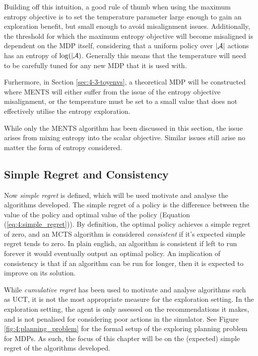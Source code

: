         Building off this intuition, a good rule of thumb when using the maximum entropy objective is to set the temperature parameter large enough to gain an exploration benefit, but small enough to avoid misalignment issues. Additionally, the threshold for which the maximum entropy objective will become misaligned is dependent on the MDP itself, considering that a uniform policy over $|\mathcal{A}|$ actions has an entropy of $\log(|\mathcal{A})$. Generally this means that the temperature will need to be carefully tuned for any new MDP that it is used with.
        
        Furhermore, in Section \ref{sec:4-3-toyenvs}, a theoretical MDP will be constructed where MENTS will either suffer from the issue of the entropy objective misalignment, or the temperature must be set to a small value that does not effectively utilise the entropy exploration. 
        
        While only the MENTS algorithm has been discussed in this section, the issue arises from mixing entropy into the scalar objective. Similar issues still arise no matter the form of entropy considered.



    \subsection{Simple Regret and Consistency}


        Now \textit{simple regret} is defined, which will be used motivate and analyse the algorithms developed. The simple regret of a policy is the difference between the value of the policy and optimal value of the policy (Equation (\ref{eq:4:simple_regret})). By definition, the optimal policy achieves a simple regret of zero, and an MCTS algorithm is considered \textit{consistent} if it's expected simple regret tends to zero. In plain english, an algorithm is consistent if left to run forever it would eventually output an optimal policy. An implication of consistency is that if an algorithm can be run for longer, then it is expected to improve on its solution.

        While \textit{cumulative regret} has been used to motivate and analyse algorithms such as UCT, it is not the most appropriate measure for the exploration setting. In the exploration setting, the agent is only assessed on the recommendations it makes, and is not penalised for considering poor actions in the simulator. See Figure \ref{fig:4:planning_problem} for the formal setup of the exploring planning problem for MDPs. As such, the focus of this chapter will be on the (expected) simple regret of the algorithms developed.

